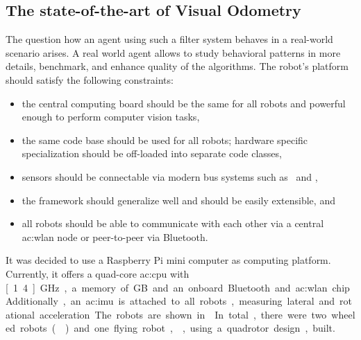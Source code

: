 \subsection{The state-of-the-art of Visual Odometry}

The question how an agent using such a filter system behaves in a real-world scenario arises.
A real world agent allows to study behavioral patterns in more details, benchmark, and enhance quality of the algorithms.
The robot's platform should satisfy the following constraints:

\begin{itemize}
  \item the central computing board should be the same for all robots and powerful enough to perform computer vision tasks,
  \item the same code base should be used for all robots; hardware specific specialization should be off-loaded into separate code classes,
  \item sensors should be connectable via modern bus systems such as \wire\ and \ic,
  \item the framework should generalize well and should be easily extensible, and
  \item all robots should be able to communicate with each other via a central \gls{ac:wlan} node or peer-to-peer via Bluetooth.
\end{itemize}

It was decided to use a Raspberry Pi mini computer as computing platform.
Currently, it offers a quad-core \gls{ac:cpu} with \unit[1.4]{GHz}, a memory of \unit[1]{GB} and an onboard Bluetooth and \gls{ac:wlan} chip.
Additionally, an \gls{ac:imu} is attached to all robots, measuring lateral and rotational acceleration.
The robots are shown in .
In total, there were two wheeled robots () and one flying robot, , using a quadrotor design, built.

